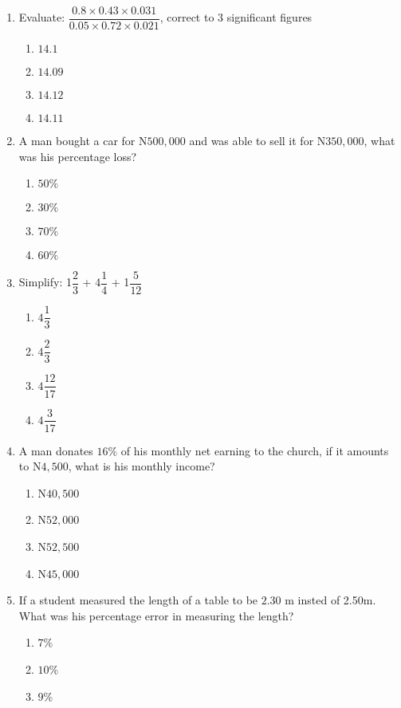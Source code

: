\begin{multicols}{2}
\begin{enumerate}[label={\arabic*.}]
\begin{enumerate}[label={\Alph*.}]
    \end{enumerate}
\item Evaluate: \(\dfrac{0.8 \times 0.43 \times 0.031}{0.05 \times 0.72 \times 0.021}\), correct to 3 significant figures
    \begin{enumerate}[label={\Alph*.}]
    \item \(14.1\)
    \item \(14.09\)
    \item \(14.12\)
    \item \(14.11\)
    \end{enumerate}
\item A man bought a car for N\(500, 000\) and was able to sell it for N\(350, 000\), what was his percentage loss?
    \begin{enumerate}[label={\Alph*.}]
    \item \(50\%\)
    \item \(30\%\)
    \item \(70\%\)
    \item \(60\%\)
    \end{enumerate}
\item Simplify: 1\(\dfrac{2}{3}\) + 4\(\dfrac{1}{4}\) + 1\(\dfrac{5}{12}\)
    \begin{enumerate}[label={\Alph*.}]
    \item \(4\dfrac{1}{3}\)
    \item \(4\dfrac{2}{3}\)
    \item \(4\dfrac{12}{17}\)
    \item \(4\dfrac{3}{17}\)
    \end{enumerate}
\item A man donates \(16\%\) of his monthly net earning to the church, if it amounts to N\(4,500\), 
what is his monthly income? 
    \begin{enumerate}[label={\Alph*.}]
    \item N\(40,500\)
    \item N\(52,000\)
    \item N\(52,500\)
    \item N\(45,000\)
    \end{enumerate}
\item If a student measured the length of a table to be \(2.30\) m insted of 2.50m. 
What was his percentage error in measuring the length?
    \begin{enumerate}[label={\Alph*.}]
    \item \(7\)\%
    \item \(10\)\%
    \item \(9\)\%

\end{enumerate}
\end{enumerate}
\end{multicols}

